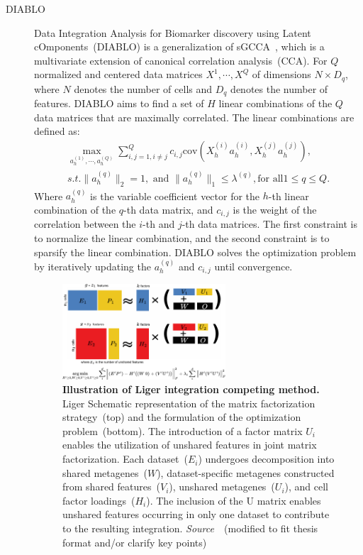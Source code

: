 \begin{description}
  \item[DIABLO]
  Data Integration Analysis for Biomarker discovery using Latent cOmponents~(DIABLO) is a generalization of sGCCA~\citep{tenenhaus2014variable}, which is a multivariate extension of canonical correlation analysis~(CCA). For $Q$ normalized and centered data matrices $X^1, \cdots, X^Q$ of dimensions $N\times D_q$, where $N$ denotes the number of cells and $D_q$ denotes the number of features. DIABLO aims to find a set of $H$ linear combinations of the $Q$ data matrices that are maximally correlated. The linear combinations are defined as:
  \begin{equation}
  \begin{aligned}
  	\underset{a_h^{(1)},\cdots,a_h^{(Q)}}{\max} \sum_{i,j=1, i\neq j}^Q c_{i,j} \text{cov}(X_h^{(i)} a_h^{(i)}, X_h^{(j)} a_h^{(j)}),\\
  	s.t. \|a_h^{(q)}\|_2 = 1, \text{ and } \|a_h^{(q)}\|_1 \leq \lambda^{(q)}, \text{for all} 1\leq q \leq Q.
  \end{aligned}
  \end{equation}
  Where $a_h^{(q)}$ is the variable coefficient vector for the $h$-th linear combination of the $q$-th data matrix, and $c_{i,j}$ is the weight of the correlation between the $i$-th and $j$-th data matrices. The first constraint is to normalize the linear combination, and the second constraint is to sparsify the linear combination. DIABLO solves the optimization problem by iteratively updating the $a_h^{(q)}$ and $c_{i,j}$ until convergence.


 \begin{figure}[!h]
  	\centering
  	\includegraphics[width=0.6\textwidth]{Alg_Liger/fig}
  	\vspace{0.1cm}
  	\caption[Illustration of Liger integration competing method.]{\textbf{Illustration of Liger integration competing method.} Liger Schematic representation of the matrix factorization strategy~(top) and the formulation of the optimization problem~(bottom). The introduction of a factor matrix $U_i$ enables the utilization of unshared features in joint matrix factorization. Each dataset~($E_i$) undergoes decomposition into shared metagenes~($W$), dataset-specific metagenes constructed from shared features~($V_i$), unshared metagenes~($U_i$), and cell factor loadings~($H_i$). The inclusion of the U matrix enables unshared features occurring in only one dataset to contribute to the resulting integration. \emph{Source~\cite{kriebel2022uinmf}}~(modified to fit thesis format and/or clarify key points)
  }
  	\label{fig:Alg_Liger}
 \end{figure}


\end{description}
